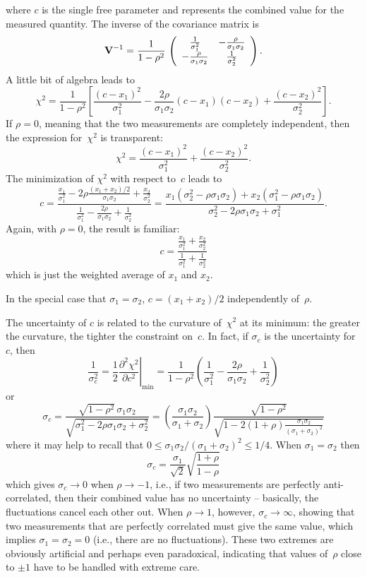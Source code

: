 \documentclass[11pt]{article}
\newcommand{\xa}   {x_1}
\newcommand{\xb}   {x_2}
\newcommand{\ua} {\sigma_{1}}
\newcommand{\ub} {\sigma_{2}}
\newcommand{\uc} {\sigma_{c}}
\newcommand{\uaq} {\sigma^2_{1}}
\newcommand{\ubq} {\sigma^2_{2}}
\newcommand{\ucq} {\sigma^2_{c}}
\begin{document}
where $c$ is the single free parameter and represents the combined
value for the measured quantity.  The inverse of the covariance matrix is
$$
{\mathbf{V}}^{-1} = \frac{1}{1 - \rho^2} \,
  \left( \begin{array}{cc}
   \frac{1}{\uaq} & -\frac{\rho}{\ua\ub} \cr -\frac{\rho}{\ua\ub} & \frac{1}{\ubq} \cr
          \end{array} \right) .
$$
A little bit of algebra leads to
$$
 \chi^2 = \frac{1}{1 - \rho^2} \left[
  \frac{(c-\xa)^2}{\uaq} - \frac{2\rho}{\ua\ub} (c-\xa)(c-\xb) + \frac{(c-\xb)^2}{\ubq}
  \right] .
$$
If $\rho = 0$, meaning that the two measurements are completely independent,
then the expression for~$\chi^2$ is transparent:
$$
 \chi^2 =   \frac{(c-\xa)^2}{\uaq}  + \frac{(c-\xb)^2}{\ubq}  .
$$
The minimization of $\chi^2$ with respect to~$c$ leads to
\begin{equation}
\label{eq:csol}
 c = \frac{
 \frac{\xa}{\uaq} - 2\rho\frac{(\xa+\xb)/2}{\ua\ub} + \frac{\xb}{\ubq} 
 }{
  \frac{1}{\uaq} - \frac{2\rho}{\ua\ub} + \frac{1}{\ubq} 
 } =
 \frac{ \xa (\ubq - \rho \ua\ub ) + \xb (\uaq - \rho \ua\ub ) }
      { \ubq - 2 \rho \ua\ub + \uaq } .
\end{equation}
Again, with $\rho = 0$, the result is familiar:
$$
 c = \frac{
 \frac{\xa}{\uaq} + \frac{\xb}{\ubq} 
 }{
  \frac{1}{\uaq} + \frac{1}{\ubq} 
 } 
$$
which is just the weighted average of $\xa$ and $\xb$.
\par
In the special case that $\ua = \ub$, $c = (\xa + \xb)/2$ independently of~$\rho$.
\par
The uncertainty of $c$ is related to the curvature of~$\chi^2$ at its minimum:
the greater the curvature, the tighter the constraint on~$c$.  In fact, if
$\uc$ is the uncertainty for~$c$, then
$$
 \frac{1}{\ucq} = \frac{1}{2} 
 \left. \frac{\partial^2 \chi^2}{\partial c^2} \right|_{\mathrm{min}}
 = \frac{1}{1 - \rho^2} \left(
  \frac{1}{\uaq} - \frac{2\rho}{\ua\ub} + \frac{1}{\ubq}
  \right) 
$$
or
$$
 \uc = \frac{ \sqrt{1 - \rho^2}\, \ua \ub}{\sqrt{ \uaq - 2\rho\ua\ub + \ubq }} 
 = \left( \frac{\ua \ub}{\ua + \ub} \right)
 \frac{ \sqrt{1 - \rho^2} } {\sqrt{ 1 - 2 (1 + \rho ) \frac{\ua\ub}{(\ua+\ub)^2} }  } 
$$
where it may help to recall that $0 \le \ua\ub/(\ua+\ub)^2 \le 1/4$.
When $\ua = \ub$ then
$$
 \uc = \frac{\ua}{\sqrt{2}} \sqrt{ \frac{1 + \rho}{1 - \rho} }
$$
which gives $\uc \rightarrow 0$ when $\rho \rightarrow -1$, i.e.,
if two measurements are perfectly anti-correlated, then their combined
value has no uncertainty -- basically, the fluctuations cancel each
other out.   When $\rho \rightarrow 1$, however, $\uc \rightarrow \infty$,
showing that two measurements that are perfectly correlated must give
the same value, which implies $\ua = \ub = 0$ (i.e., there are no
fluctuations).   These two extremes are obviously artificial and perhaps
even paradoxical, indicating that values of~$\rho$ close to $\pm 1$ have
to be handled with extreme care.
\end{document}
